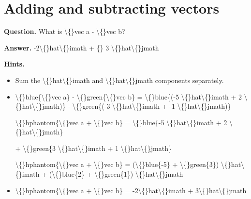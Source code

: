 \documentclass{article}
\begin{document}
\section*{Adding and subtracting vectors}
\textbf{Question.} What is \textbackslash\{\}vec a - \textbackslash\{\}vec b?

\textbf{Answer.} -2\textbackslash\{\}hat\textbackslash\{\}imath + \{\}
                    3 \textbackslash\{\}hat\textbackslash\{\}jmath

\textbf{Hints.}
\begin{itemize}
  \item Sum the \textbackslash\{\}hat\textbackslash\{\}imath and \textbackslash\{\}hat\textbackslash\{\}jmath components separately.
  \item \textbackslash\{\}blue\{\textbackslash\{\}vec a\} -  \textbackslash\{\}green\{\textbackslash\{\}vec b\} = 
                    \textbackslash\{\}blue\{(-5 \textbackslash\{\}hat\textbackslash\{\}imath + 2 \textbackslash\{\}hat\textbackslash\{\}jmath)\} -
                    \textbackslash\{\}green\{(-3 \textbackslash\{\}hat\textbackslash\{\}imath + -1 \textbackslash\{\}hat\textbackslash\{\}jmath)\}
                
            
            
            
                
                    \textbackslash\{\}hphantom\{\textbackslash\{\}vec a + \textbackslash\{\}vec b\} = 
                    \textbackslash\{\}blue\{-5 \textbackslash\{\}hat\textbackslash\{\}imath + 2 \textbackslash\{\}hat\textbackslash\{\}jmath\}
                
                +
                \textbackslash\{\}green\{3 \textbackslash\{\}hat\textbackslash\{\}imath + 1 \textbackslash\{\}hat\textbackslash\{\}jmath\}
            
            
            
                \textbackslash\{\}hphantom\{\textbackslash\{\}vec a + \textbackslash\{\}vec b\} = (\textbackslash\{\}blue\{-5\}
                +
                \textbackslash\{\}green\{3\}) \textbackslash\{\}hat\textbackslash\{\}imath + (\textbackslash\{\}blue\{2\}
                +
                \textbackslash\{\}green\{1\}) \textbackslash\{\}hat\textbackslash\{\}jmath
  \item \textbackslash\{\}hphantom\{\textbackslash\{\}vec a + \textbackslash\{\}vec b\} = -2\textbackslash\{\}hat\textbackslash\{\}imath + 3\textbackslash\{\}hat\textbackslash\{\}jmath
\end{itemize}
\end{document}
